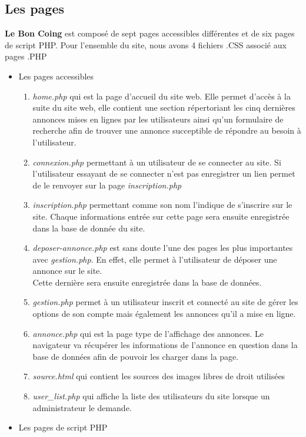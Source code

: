 \documentclass[11pt,a4paper]{article}
\begin{document}
\subsection{Les pages}
\textbf{Le Bon Coing} est composé de sept pages accessibles différentes et de six pages de script PHP. Pour l'ensemble du site, nous avons 4 fichiers .CSS associé aux pages .PHP
\begin{itemize}
    \item Les pages accessibles
    \begin{enumerate}
        \item \emph{home.php} qui est la page d'accueil du site web. Elle permet d'accès à la suite du site web, elle contient une section répertoriant les cinq dernières annonces mises en lignes par les utilisateurs ainsi qu'un formulaire de recherche afin de trouver une annonce succeptible de répondre au besoin à l'utilisateur.
        \item \emph{connexion.php} permettant à un utilisateur de se connecter au site. Si l'utilisateur essayant de se connecter n'est pas enregistrer un lien permet de le renvoyer sur la page \emph{inscription.php}
        \item \emph{inscription.php} permettant comme son nom l'indique de s'inscrire sur le site. Chaque informations entrée sur cette page sera ensuite enregistrée dans la base de donnée du site.
        \item \emph{deposer-annonce.php} est sans doute l'une des pages les plus importantes avec \emph{gestion.php}. En effet, elle permet à l'utilisateur de déposer une annonce sur le site.\\ Cette dernière sera ensuite enregistrée dans la base de données.
        \item \emph{gestion.php} permet à un utilisateur inscrit et connecté au site de gérer les options de son compte mais également les annonces qu'il a mise en ligne.
        \item \emph{annonce.php} qui est la page type de l'affichage des annonces. Le navigateur va récupérer les informations de l'annonce en question dans la base de données afin de pouvoir les charger dans la page.
        \item \emph{source.html} qui contient les sources des images libres de droit utilisées
        \item \emph{user\_list.php} qui affiche la liste des utilisateurs du site lorsque un administrateur le demande.
    \end{enumerate}
    \item Les pages de script PHP

\end{itemize}
\end{document}
